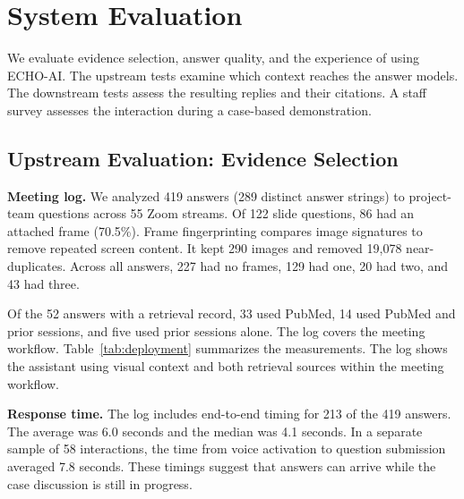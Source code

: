 \documentclass[11pt]{article}
\begin{document}
\section{System Evaluation}\label{sec:eval}

We evaluate evidence selection, answer quality, and the experience of using ECHO-AI. The upstream tests examine which context reaches the answer models. The downstream tests assess the resulting replies and their citations. A staff survey assesses the interaction during a case-based demonstration.

\subsection{Upstream Evaluation: Evidence Selection}\label{sec:upstream}

\textbf{Meeting log.} We analyzed 419 answers (289 distinct answer strings) to project-team questions across 55 Zoom streams. Of 122 slide questions, 86 had an attached frame (70.5\%). Frame fingerprinting compares image signatures to remove repeated screen content. It kept 290 images and removed 19,078 near-duplicates. Across all answers, 227 had no frames, 129 had one, 20 had two, and 43 had three.

Of the 52 answers with a retrieval record, 33 used PubMed, 14 used PubMed and prior sessions, and five used prior sessions alone. The log covers the meeting workflow. Table~\ref{tab:deployment} summarizes the measurements. The log shows the assistant using visual context and both retrieval sources within the meeting workflow.

\textbf{Response time.} The log includes end-to-end timing for 213 of the 419 answers. The average was 6.0 seconds and the median was 4.1 seconds. In a separate sample of 58 interactions, the time from voice activation to question submission averaged 7.8 seconds. These timings suggest that answers can arrive while the case discussion is still in progress.
\end{document}
